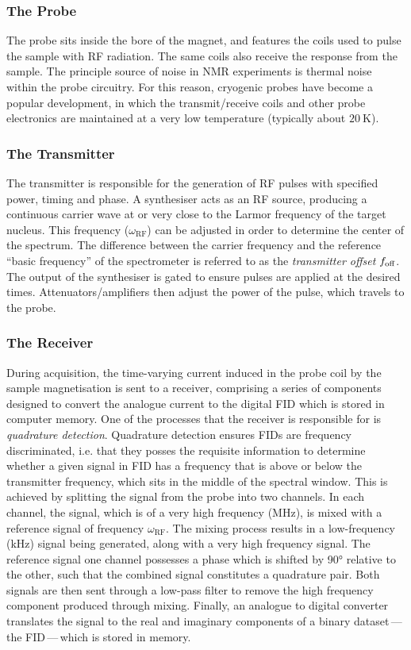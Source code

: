 \subsubsection{The Probe}
The probe sits inside the bore of the magnet, and features the coils used to
pulse the sample with \ac{RF} radiation. The same coils also
receive the response from the sample. The principle source of noise in
\ac{NMR} experiments is thermal noise within the probe circuitry. For
this reason, cryogenic probes\cite{Kovacs2020} have become a popular
development, in which the transmit/receive coils and other probe electronics
are maintained at a very low temperature (typically about $\qty{20}{\kelvin}$).

\subsubsection{The Transmitter}
The transmitter is responsible for the generation of \ac{RF} pulses
with specified power, timing and phase.
A synthesiser acts as an \ac{RF} source, producing a continuous carrier wave at
or very close to the Larmor frequency of the target nucleus. This frequency
($\omega_{\text{RF}}$) can be adjusted in order to determine the center of the
spectrum. The difference between the carrier frequency and the reference
``basic frequency'' of the spectrometer is referred to as the \emph{transmitter
offset} $f_{\text{off}}$.  The output of the synthesiser is gated to ensure pulses are
applied at the desired times. Attenuators/amplifiers then adjust the power
of the pulse, which travels to the probe.

\subsubsection{The Receiver}
During acquisition, the time-varying current induced in the probe coil by
the sample magnetisation is
sent to a receiver, comprising a series of components designed to convert the
analogue current to the digital \ac{FID} which is stored in computer memory.
One of the processes that the receiver is responsible for is \emph{quadrature
detection}\cite[Section 13.6]{Keeler2010}. Quadrature detection ensures
\acp{FID} are frequency discriminated, i.e. that they posses the requisite
information to determine whether a given signal in \ac{FID} has a frequency
that is above or below the transmitter frequency, which sits in the middle of
the spectral window.
This is achieved by splitting the signal from the probe into two channels. In
each channel, the signal, which is of a very high frequency
(\unit{\mega\hertz}), is mixed with a reference signal of frequency
$\omega_{\text{RF}}$. The mixing process results in a low-frequency
(\unit{\kilo\hertz}) signal being generated, along with a very high frequency
signal. The reference signal one channel possesses a phase which
is shifted by \ang{90} relative to the other, such that the combined signal
constitutes a quadrature pair.
Both signals are then sent through a low-pass filter to remove
the high frequency component produced through mixing. Finally, an analogue to
digital converter translates the signal to the real and imaginary components of
a binary dataset\,---\,the \ac{FID}\,---\,which is stored in memory.

